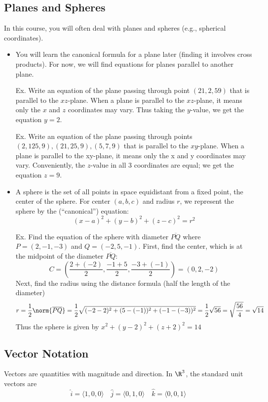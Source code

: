 \documentclass[]{mangos-musings}
\begin{document}
\subsection{Planes and Spheres}
In this course, you will often deal with planes and spheres (e.g., spherical coordinates). 
\begin{itemize}
  \item You will learn the canonical formula for a plane later (finding it involves cross products). For now, we will find equations for planes parallel to another plane.
  \item[Ex.] Write an equation of the plane passing through point $(21, 2, 59)$ that is parallel to the $xz$-plane.
  \subitem When a plane is parallel to the $xz$-plane, it means only the $x$ and $z$ coordinates may vary. 
  \subitem Thus taking the $y$-value, we get the equation $y = 2$.
  \item[Ex.] Write an equation of the plane passing through points $(2, 125, 9), (21, 25, 9), (5, 7, 9)$ that is parallel to the $xy$-plane. 
  \subitem When a plane is parallel to the xy-plane, it means only the x and y coordinates may vary. 
  \subitem Conveniently, the $z$-value in all 3 coordinates are equal; we get the equation $z = 9$.
  \item A sphere is the set of all points in space equidistant from a fixed point, the center of
  the sphere. For center $(a, b, c)$ and radius $r$, we represent the sphere by the (``canonical'') equation: 
  \[(x-a)^2 + (y-b)^2 + (z-c)^2 = r^2\]
  \item[Ex.] Find the equation of the sphere with diameter $\overline{PQ}$ where $P = (2, -1, -3)$ and $Q = (-2, 5, -1)$.
  \subitem First, find the center, which is at the midpoint of the diameter $\overline{PQ}$:
  \[C = \left(\dfrac{2 + (-2)}{2}, \dfrac{-1 + 5}{2}, \dfrac{-3 + (-1)}{2}\right) = \left(0, 2, -2\right)\]
  \subitem Next, find the radius using the distance formula (half the length of the diameter)
  \[r = \dfrac{1}{2}\norm{\overline{PQ}} 
      = \dfrac{1}{2}\sqrt{(-2 - 2)^2 + (5 - (-1))^2 + (-1 - (-3))^2}
      = \dfrac{1}{2}\sqrt{56}
      = \sqrt{\dfrac{56}{4}}
      = \sqrt{14}\]
  \subitem Thus the sphere is given by $x^2 + (y-2)^2 + (z+2)^2 = 14$
\end{itemize}
\subsection{Vector Notation}
Vectors are quantities with magnitude and direction. In $\R^3$, the standard unit vectors are 
\[\hat{i} = \langle1, 0, 0\rangle \quad \hat{j} = \langle0, 1, 0\rangle \quad \hat{k} = \langle0, 0, 1\rangle \]
\end{document}
